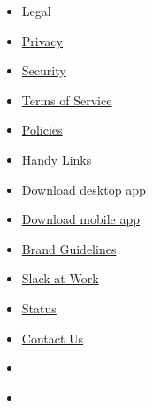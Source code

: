\begin{itemize}
\tightlist
\item
  Legal
\item
  \href{/privacy-policy}{Privacy}
\item
  \href{/security}{Security}
\item
  \href{/terms-of-service}{Terms of Service}
\item
  \href{/policies}{Policies}
\end{itemize}

\begin{itemize}
\tightlist
\item
  Handy Links
\item
  \href{/downloads}{Download desktop app}
\item
  \href{/downloads}{Download mobile app}
\item
  \href{/brand-guidelines}{Brand Guidelines}
\item
  \href{https://slackatwork.com}{Slack at Work}
\item
  \href{https://status.slack.com/}{Status}
\end{itemize}

\href{https://slack.com}{}

\begin{itemize}
\tightlist
\item
  \href{/help/contact}{Contact Us}
\item
  \href{https://twitter.com/SlackHQ}{}
\item
  \href{https://www.youtube.com/channel/UCY3YECgeBcLCzIrFLP4gblw}{}
\end{itemize}
